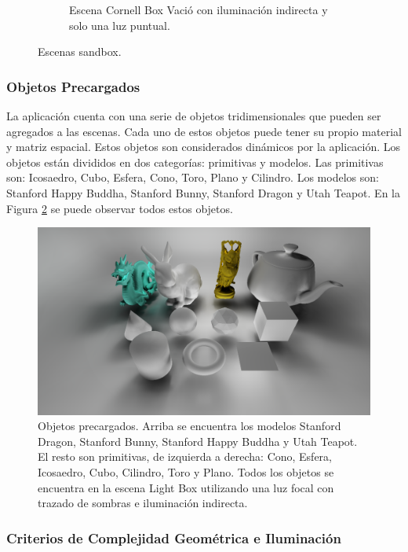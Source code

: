 \begin{figure}[H]
\begin{subfigure}[t]{0.32\textwidth}
		\caption*{Escena Cornell Box Vació con iluminación indirecta y solo una luz puntual.}
	\end{subfigure}
	\caption{Escenas sandbox.}
	\label{fig:sandboxscenes}
\end{figure}

\subsubsection{Objetos Precargados}
La aplicación cuenta con una serie de objetos tridimensionales que pueden ser agregados a las escenas. Cada uno de estos objetos puede tener su propio material y matriz espacial. Estos objetos son considerados dinámicos por la aplicación. Los objetos están divididos en dos categorías: primitivas y modelos. Las primitivas son: Icosaedro, Cubo, Esfera, Cono, Toro, Plano y Cilindro. Los modelos son: Stanford Happy Buddha, Stanford Bunny, Stanford Dragon y Utah Teapot. En la Figura \ref{fig:models} se puede observar todos estos objetos.

\begin{figure}[H]
	\centering
	\includegraphics[width=0.95\linewidth]{media/scenes/models.png}
	\caption{Objetos precargados. Arriba se encuentra los modelos Stanford Dragon, Stanford Bunny, Stanford Happy Buddha y Utah Teapot. El resto son primitivas, de izquierda a derecha: Cono, Esfera, Icosaedro, Cubo, Cilindro, Toro y Plano. Todos los objetos se encuentra en la escena Light Box utilizando una luz focal con trazado de sombras e iluminación indirecta.}
	\label{fig:models}
\end{figure}

\subsubsection{Criterios de Complejidad Geométrica e Iluminación}

